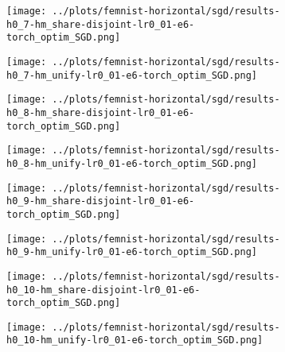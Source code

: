 \begin{figure}[htbp]  %
    \centering
    \begin{subfigure}[b]{0.47\textwidth}
        \centering
        \texttt{[image: ../plots/femnist-horizontal/sgd/results-h0\_7-hm\_share-disjoint-lr0\_01-e6-torch\_optim\_SGD.png]}
    \end{subfigure}
    \hfill
    \begin{subfigure}[b]{0.47\textwidth}
        \centering
        \texttt{[image: ../plots/femnist-horizontal/sgd/results-h0\_7-hm\_unify-lr0\_01-e6-torch\_optim\_SGD.png]}
    \end{subfigure}
\end{figure}
\begin{figure}[htbp]  %
    \centering
    \begin{subfigure}[b]{0.47\textwidth}
        \centering
        \texttt{[image: ../plots/femnist-horizontal/sgd/results-h0\_8-hm\_share-disjoint-lr0\_01-e6-torch\_optim\_SGD.png]}
    \end{subfigure}
    \hfill
    \begin{subfigure}[b]{0.47\textwidth}
        \centering
        \texttt{[image: ../plots/femnist-horizontal/sgd/results-h0\_8-hm\_unify-lr0\_01-e6-torch\_optim\_SGD.png]}
    \end{subfigure}
\end{figure}
\begin{figure}[htbp]  %
    \centering
    \begin{subfigure}[b]{0.47\textwidth}
        \centering
        \texttt{[image: ../plots/femnist-horizontal/sgd/results-h0\_9-hm\_share-disjoint-lr0\_01-e6-torch\_optim\_SGD.png]}
    \end{subfigure}
    \hfill
    \begin{subfigure}[b]{0.47\textwidth}
        \centering
        \texttt{[image: ../plots/femnist-horizontal/sgd/results-h0\_9-hm\_unify-lr0\_01-e6-torch\_optim\_SGD.png]}
    \end{subfigure}
\end{figure}
\begin{figure}[htbp]  %
    \centering
    \begin{subfigure}[b]{0.47\textwidth}
        \centering
        \texttt{[image: ../plots/femnist-horizontal/sgd/results-h0\_10-hm\_share-disjoint-lr0\_01-e6-torch\_optim\_SGD.png]}
    \end{subfigure}
    \hfill
    \begin{subfigure}[b]{0.47\textwidth}
        \centering
        \texttt{[image: ../plots/femnist-horizontal/sgd/results-h0\_10-hm\_unify-lr0\_01-e6-torch\_optim\_SGD.png]}
    \end{subfigure}
\end{figure}
